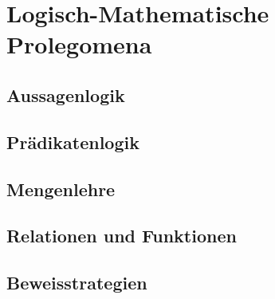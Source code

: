 \chapter{Logisch-Mathematische Prolegomena}
\section{Aussagenlogik}
\section{Prädikatenlogik}
\section{Mengenlehre}\label{mengenlehre}
\section{Relationen und Funktionen}\label{relationenUndFunktionen}
\section{Beweisstrategien}
